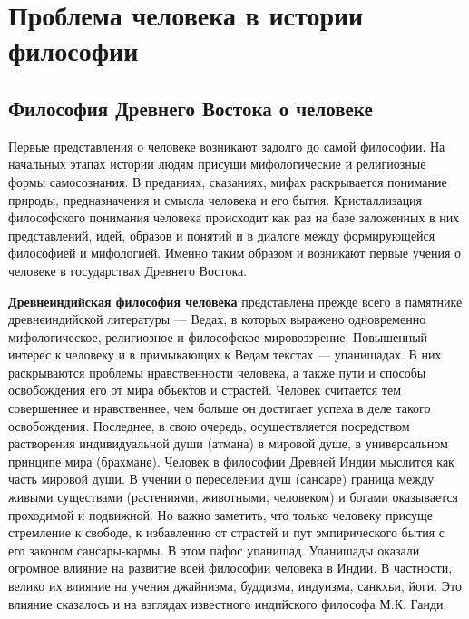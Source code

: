 \documentclass[12pt]{article}
\begin{document}
\newpage
\section{Проблема человека в истории философии}
\subsection{Философия Древнего Востока о человеке}
Первые  представления о человеке  возникают задолго до  самой  философии.  На начальных этапах истории
людям  присущи  мифологические  и  религиозные  формы  самосознания.  В  преданиях,  сказаниях,  мифах
раскрывается  понимание  природы,  предназначения  и  смысла  человека  и  его  бытия.  Кристаллизация
философского понимания человека происходит как раз на базе заложенных в них представлений, идей, образов
и понятий и в диалоге между формирующейся философией и мифологией. Именно таким образом и возникают
первые учения о человеке в государствах Древнего Востока.

\textbf{Древнеиндийская философия человека} представлена прежде всего в памятнике древнеиндийской литературы —
Ведах,  в  которых  выражено  одновременно  мифологическое,  религиозное  и  философское  мировоззрение.
Повышенный интерес к человеку и в примыкающих к Ведам текстах — упанишадах. В них раскрываются
проблемы нравственности человека, а также пути и способы освобождения его от мира объектов и страстей.
Человек  считается  тем  совершеннее  и  нравственнее,  чем  больше  он  достигает  успеха  в  деле  такого 
освобождения. Последнее, в свою очередь, осуществляется посредством растворения индивидуальной души
(атмана) в мировой душе, в универсальном принципе мира (брахмане).
Человек  в  философии  Древней  Индии  мыслится  как  часть  мировой  души.  В  учении  о  переселении  душ
(сансаре)  граница  между  живыми  существами  (растениями,  животными,  человеком)  и  богами  оказывается
проходимой  и  подвижной.  Но  важно  заметить,  что  только  человеку  присуще  стремление  к  свободе,  к
избавлению от страстей и пут эмпирического бытия с его законом сансары-кармы. В этом пафос упанишад.
Упанишады оказали огромное влияние на развитие всей философии человека в Индии. В частности, велико их
влияние  на  учения  джайнизма,  буддизма,  индуизма,  санкхьи,  йоги.  Это  влияние  сказалось  и  на  взглядах
известного индийского философа М.К. Ганди.
\end{document}
